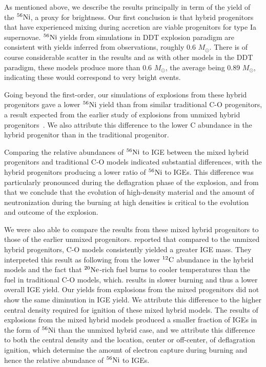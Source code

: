\documentclass[preprint2]{aastex63}
\newcommand{\C}[1]{\ensuremath{{}^{#1}{\rm C}}}
\newcommand{\Ne}[1]{\ensuremath{{}^{#1}{\rm Ne}}}
\newcommand{\Ni}[1]{\ensuremath{{}^{#1}{\rm Ni}}}
\newcommand{\Msun}{\ensuremath{M_\odot}}
\begin{document}
As mentioned above, we describe the results principally in term of the
yield of the \Ni{56}, a proxy for brightness.  Our first conclusion
is that hybrid progenitors that have experienced mixing during accretion are 
viable progenitors for type Ia supernovae. \Ni{56} yields from simulations
in DDT explosion paradigm are consistent with yields inferred from
observations, roughly 0.6 \Msun.  There is of course considerable scatter
in the results and as with other models in the DDT paradigm,
these models produce more than 0.6 \Msun, the average being 0.89 \Msun,
indicating these would correspond to very bright events.  

Going beyond the first-order, our simulations of explosions from
these hybrid progenitors gave a lower \Ni{56} yield than from
similar traditional C-O progenitors, a result expected from
the earlier study of explosions from unmixed hybrid 
progenitors~\citep{willcoxetal2016}. We also attribute this 
difference to the lower C abundance in the hybrid progenitor than
in the traditional progenitor. 

Comparing the relative abundances of \Ni{56} to IGE between the
mixed hybrid progenitors and traditional C-O models indicated
substantial differences, with the hybrid progenitors producing
a lower ratio of \Ni{56} to IGEs. This difference was particularly
pronounced during the deflagration phase of the explosion, and 
from that we conclude that the evolution of high-density material
and the amount of neutronization during the burning at high densities
is critical to the evolution and outcome of the explosion.

We were also able to compare the results from these mixed
hybrid progenitors to those of the earlier unmixed progenitors.
\citet{willcoxetal2016} reported that compared to the unmixed
hybrid progenitors, C-O models consistently yielded a greater IGE mass. 
They interpreted this result as following from 
the lower \C{12} abundance in the hybrid models and the fact that \Ne{20}-rich fuel burns to cooler 
temperatures than the fuel in traditional C-O models, which. results in slower burning and thus a lower
overall IGE yield. Our yields from explosions from the mixed progenitors did not
show the same diminution in IGE yield. We attribute this difference to the higher
central density required for ignition of these mixed hybrid models.
The results of explosions from the mixed hybrid models 
produced a smaller fraction of IGEs in the form of \Ni{56} than the unmixed hybrid case, 
and we attribute this difference 
to both the central density and the location, center or off-center, of deflagration ignition,
which determine the amount of electron capture during burning and hence the relative abundance
of \Ni{56} to IGEs.
\end{document}
